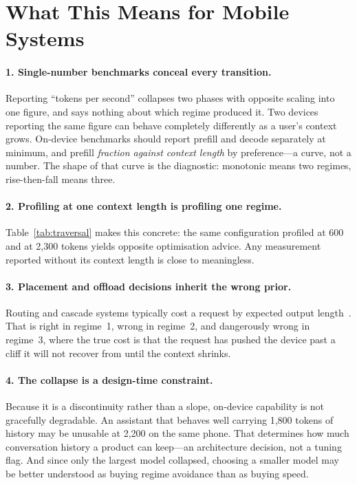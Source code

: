 \documentclass[sigconf,nonacm,10pt]{acmart}
\begin{document}
\section{What This Means for Mobile Systems}
\label{sec:implications}

\paragraph{1. Single-number benchmarks conceal every transition.}
Reporting ``tokens per second'' collapses two phases with opposite scaling into one figure, and says nothing
about which regime produced it. Two devices reporting the same figure can behave completely differently as a
user's context grows. On-device benchmarks should report prefill and decode separately at minimum, and prefill
\emph{fraction against context length} by preference---a curve, not a number. The shape of that curve is the
diagnostic: monotonic means two regimes, rise-then-fall means three.

\paragraph{2. Profiling at one context length is profiling one regime.}
Table~\ref{tab:traversal} makes this concrete: the same configuration profiled at 600 and at 2{,}300 tokens
yields opposite optimisation advice. Any measurement reported without its context length is close to
meaningless.

\paragraph{3. Placement and offload decisions inherit the wrong prior.}
Routing and cascade systems typically cost a request by expected output
length~\cite{chen2023frugalgpt,ong2024routellm,schuster2022calm}. That is right in regime~1, wrong in regime~2,
and dangerously wrong in regime~3, where the true cost is that the request has pushed the device past a cliff
it will not recover from until the context shrinks.

\paragraph{4. The collapse is a design-time constraint.}
Because it is a discontinuity rather than a slope, on-device capability is not gracefully degradable. An
assistant that behaves well carrying 1{,}800 tokens of history may be unusable at 2{,}200 on the same phone.
That determines how much conversation history a product can keep---an architecture decision, not a tuning flag.
And since only the largest model collapsed, choosing a smaller model may be better understood as buying regime
avoidance than as buying speed.
\end{document}
